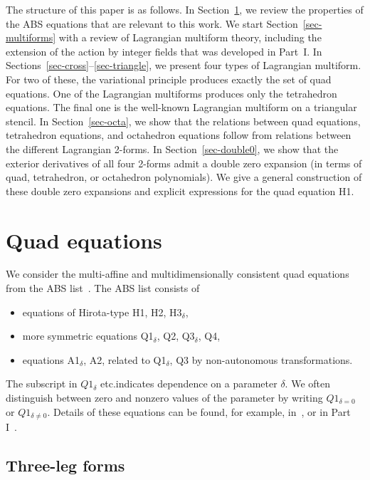\documentclass[pdftex]{sigma}
\numberwithin{equation}{section}
\begin{document}
The structure of this paper is as follows. In Section~\ref{sec-abs}, we review the properties of the ABS equations that are relevant to this work. We start Section~\ref{sec-multiforms} with a review of Lagrangian multiform theory, including the extension of the action by integer fields that was developed in Part~I. In Sections~\ref{sec-cross}--\ref{sec-triangle}, we present four types of Lagrangian multiform. For two of these, the variational principle produces exactly the set of quad equations. One of the Lagrangian multiforms produces only the tetrahedron equations. The final one is the well-known Lagrangian multiform on a triangular stencil. In Section~\ref{sec-octa}, we show that the relations between quad equations, tetrahedron equations, and octahedron equations follow from relations between the different Lagrangian 2-forms. In Section~\ref{sec-double0}, we show that the exterior derivatives of all four 2-forms admit a double zero expansion (in terms of quad, tetrahedron, or octahedron polynomials). We give a general construction of these double zero expansions and explicit expressions for the quad equation H1.

\section{Quad equations}\label{sec-abs}

We consider the multi-affine and multidimensionally consistent quad equations from the ABS list~\cite{adler2003classification}. The ABS list consists of
\begin{itemize}	\itemsep=0pt
 \item equations of Hirota-type H1, H2, H3$_{\delta}$,
 \item more symmetric equations Q1$_{\delta}$, Q2, Q3$_{\delta}$, Q4,
 \item equations A1$_{\delta}$, A2, related to Q1$_{\delta}$, Q3 by non-autonomous transformations.
\end{itemize}
The subscript in $Q1_{\delta}$ etc.\@ indicates dependence on a parameter $\delta$. We often distinguish between zero and nonzero values of the parameter by writing $Q1_{\delta=0}$ or $Q1_{\delta\neq0}$.
Details of these equations can be found, for example, in~\cite{adler2003classification, bobenko2010lagrangian, hietarinta2009soliton, nijhoff2009soliton}, or in Part I~\cite{richardson2025discrete1}.

\subsection{Three-leg forms}
\end{document}
